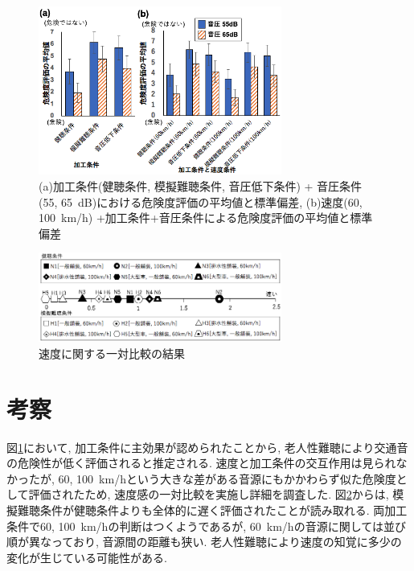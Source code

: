 \documentclass[10pt,twocolumn,uplatex,dvipdfmx]{jsarticle} %
\begin{document}
\begin{figure}[H]
  \begin{center}
      \includegraphics[width=8cm]{image/danger_result.png}
      \caption{(a)加工条件(健聴条件, 模擬難聴条件, 音圧低下条件) + 音圧条件(55, 65~dB)における危険度評価の平均値と標準偏差, (b)速度(60, 100~km/h) +加工条件+音圧条件による危険度評価の平均値と標準偏差}
      \label{fig:danger_result}
  \end{center}
\end{figure}

\vspace{-3truemm}

\begin{figure}[H]
  \begin{center}
      \includegraphics[width=8cm]{image/speed_result.png}
      \caption{速度に関する一対比較の結果}
      \label{fig:speed_result}
  \end{center}
\end{figure}

\vspace{-3truemm}


\section{考察}

図\ref{fig:danger_result}において, 加工条件に主効果が認められたことから, 老人性難聴により交通音の危険性が低く評価されると推定される.
速度と加工条件の交互作用は見られなかったが, 60, 100~km/hという大きな差がある音源にもかかわらず似た危険度として評価されたため, 速度感の一対比較を実施し詳細を調査した.
図\ref{fig:speed_result}からは, 模擬難聴条件が健聴条件よりも全体的に遅く評価されたことが読み取れる. 両加工条件で60, 100~km/hの判断はつくようであるが,  60~km/hの音源に関しては並び順が異なっており, 音源間の距離も狭い. 老人性難聴により速度の知覚に多少の変化が生じている可能性がある.
\end{document}
